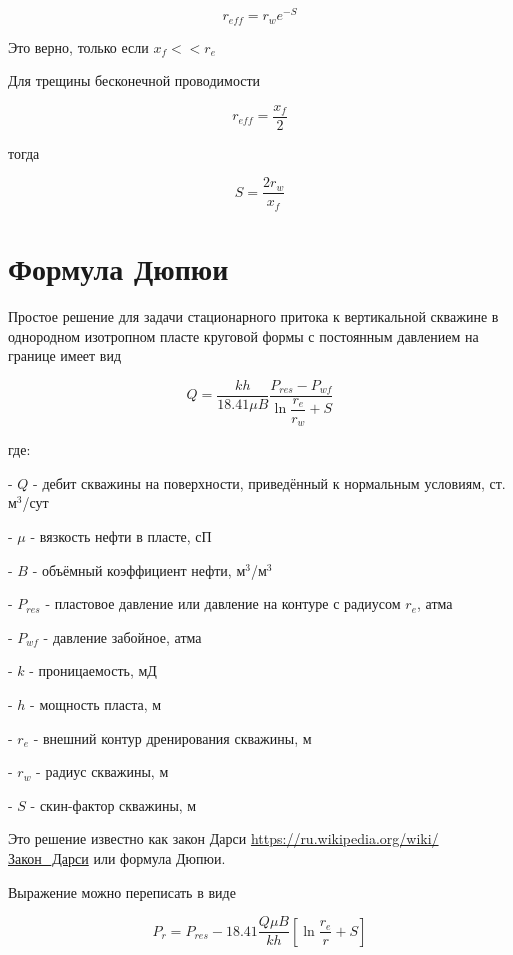 \begin{equation}
	r_{eff} = r_w e^{-S}
\end{equation}

Это верно, только если $x_f << r_e$

Для трещины бесконечной проводимости 

\begin{equation}
	r_{eff} = \frac{x_f}{2}
\end{equation}

тогда 

\begin{equation}
	S = \frac{2r_w}{x_f}
\end{equation}


	
\section{Формула Дюпюи}

Простое решение для задачи стационарного притока к вертикальной скважине в однородном изотропном пласте круговой формы с постоянным давлением на границе имеет вид

\begin{equation}
	Q=\dfrac{kh}{18.41\mu B} \dfrac{P_{res}-P_{wf}}{\ln \dfrac{r_e}{r_w} + S} 
\end{equation}


где: 

- $Q$ - дебит скважины на поверхности, приведённый к нормальным условиям, ст. м$^3$/сут

- $\mu$ - вязкость нефти в пласте, сП

- $B$ - объёмный коэффициент нефти, м$^3$/м$^3$

- $P_{res}$ - пластовое давление или давление на контуре с радиусом $r_e$, атма

- $P_{wf}$ - давление забойное, атма

- $k$ - проницаемость, мД

- $h$ - мощность пласта, м

- $r_e$ - внешний контур дренирования скважины, м

- $r_w$ - радиус скважины, м

- $S$ - скин-фактор скважины, м

Это решение известно как закон Дарси \url{https://ru.wikipedia.org/wiki/Закон_Дарси} или формула Дюпюи.

Выражение можно переписать в виде

\begin{equation}
	P_{r} = P_{res} - 18.41\dfrac{ Q\mu B }{kh} \left[ \ln\dfrac{r_e}{r} +S \right]
\end{equation}

